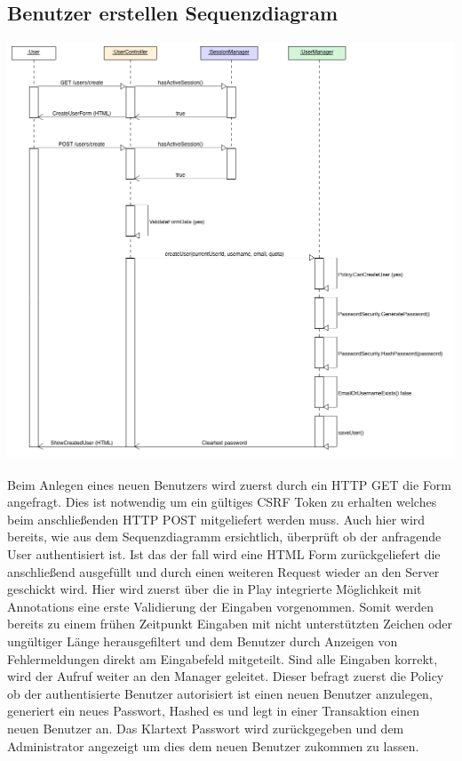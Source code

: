 \documentclass[12pt,DIV14,BCOR10mm,a4paper,twoside,parskip=half-,headsepline,headinclude,english,ngerman,bibliography=totocnumbered]{scrreprt}
\begin{document}
\subsection{Benutzer erstellen Sequenzdiagram}

\includegraphics[width=0.7\paperwidth]{resources/createuserseq_diagram.png}

Beim Anlegen eines neuen Benutzers wird zuerst durch ein HTTP GET die Form angefragt. Dies ist notwendig um ein gültiges CSRF Token zu erhalten welches beim anschließenden HTTP POST mitgeliefert werden muss. Auch hier wird bereits, wie aus dem Sequenzdiagramm ersichtlich, überprüft ob der anfragende User authentisiert ist. Ist das der fall wird eine HTML Form zurückgeliefert die anschließend ausgefüllt und durch einen weiteren Request wieder an den Server geschickt wird. Hier wird zuerst über die in Play integrierte Möglichkeit mit Annotations eine erste Validierung der Eingaben vorgenommen. Somit werden bereits zu einem frühen Zeitpunkt Eingaben mit nicht unterstützten Zeichen oder ungültiger Länge herausgefiltert und dem Benutzer durch Anzeigen von Fehlermeldungen direkt am Eingabefeld mitgeteilt. Sind alle Eingaben korrekt, wird der Aufruf weiter an den Manager geleitet. Dieser befragt zuerst die Policy ob der authentisierte Benutzer autorisiert ist einen neuen Benutzer anzulegen, generiert ein neues Passwort, Hashed es und legt in einer Transaktion einen neuen Benutzer an. Das Klartext Passwort wird zurückgegeben und dem Administrator angezeigt um dies dem neuen Benutzer zukommen zu lassen.
\end{document}
